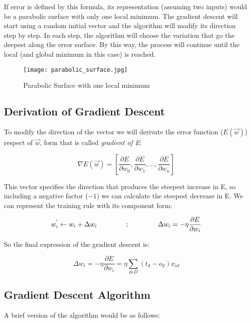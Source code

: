 	If error is defined by this formula, its representation (assuming two inputs) would be a parabolic surface with only one local minimum. The gradient descent will start using a random initial vector and the algorithm will modify its direction step by step. In each step, the algorithm will choose the variation that go the deepest along the error surface. By this way, the process will continue until the local (and global minimum in this case) is reached.

	\begin{figure}[ht]
		\centering
		\texttt{[image: parabolic\_surface.jpg]}
		\caption{Parabolic Surface with one local minimum}
	\end{figure}

	\subsection{Derivation of Gradient Descent}
	To modify the direction of the vector we will derivate the error function ($E(\vec{w})$) respect of $\vec{w}$, form that is called \textit{gradient of E}:

	\begin{equation}
		\label{gradient_of_E}
		\nabla E(\vec{w})= [\frac{\partial{E}}{\partial{w_{0}}}, \frac{\partial{E}}{\partial{w_{1}}}, ..., \frac{\partial{E}}{\partial{w_{n}}}]
	\end{equation}

	This vector specifies the direction that produces the steepest increase in E, so including a negative factor ($-1$) we can calculate the steepest decrease in E. We can represent the training rule with its component form:

	\begin{equation}
		\label{training_rule_component_form}
		w_{i}^{'} \leftarrow w_{i} + \Delta w_{i} \hspace{1.5cm} ; \hspace{1.5cm} \Delta{w_{i}}=-\eta \frac{\partial{E}}{\partial{w_i}}
	\end{equation}

	So the final expression of the gradient descent is:

	\begin{equation}
		\label{gradient_descent_final_expr}
		\Delta w_i = -\eta \frac{\partial{E}}{\partial{w_i}} = \eta \sum_{d \varepsilon D} (t_d - o_d) x_{id}
	\end{equation}


	\subsection{Gradient Descent Algorithm}
	A brief version of the algorithm would be as follows:

